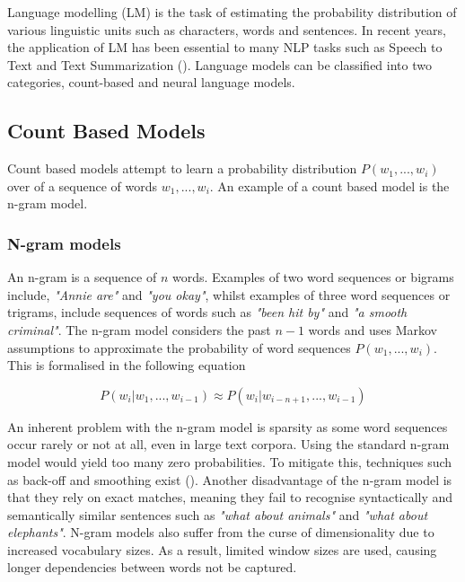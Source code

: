 \noindent
\newline
Language modelling (LM) is the task of estimating the probability distribution of various linguistic units such as characters, words and sentences. In recent years, the application of LM  has been essential to many NLP tasks such as Speech to Text and Text Summarization (\cite{Rush2015}). Language models can be classified into two categories, count-based and neural language models. 

\subsection{Count Based Models}
Count based models attempt to learn a probability distribution \(P(w_{1},...,w_{i}) \) over of a sequence of words \(w_{1},...,w_{i}\). An example of a count based model is the n-gram model.

\subsubsection{N-gram models}
An n-gram is a sequence of \(n\) words. Examples of two word sequences or bigrams include, \textit{"Annie are"} and \textit{"you okay"}, whilst examples of three word sequences or trigrams, include sequences of words such as \textit{"been hit by"} and \textit{"a smooth criminal"}. The n-gram model considers the past \(n-1\) words and uses Markov assumptions to approximate the probability of word sequences \(P(w_{1},...,w_{i}) \). This is formalised in the following equation

\begin{equation}
	P(w_{i} | w_{1},...,w_{i-1}) \approx P(w_{i} | w_{i-n+1},...,w_{i-1})
\end{equation}

\noindent
\newline
An inherent problem with the n-gram model is sparsity as some word sequences occur rarely or not at all, even in large text corpora. Using the standard n-gram model would yield too many zero probabilities. To mitigate this, techniques such as back-off  and smoothing exist (\cite{Katz1987}). Another disadvantage of the n-gram model is that they rely on exact matches, meaning they fail to recognise syntactically and semantically similar sentences such as \textit{"what about animals"} and \textit{"what about elephants"}. N-gram models also suffer from the curse of dimensionality due to increased vocabulary sizes. As a result, limited window sizes are used, causing longer dependencies between words not be captured.

